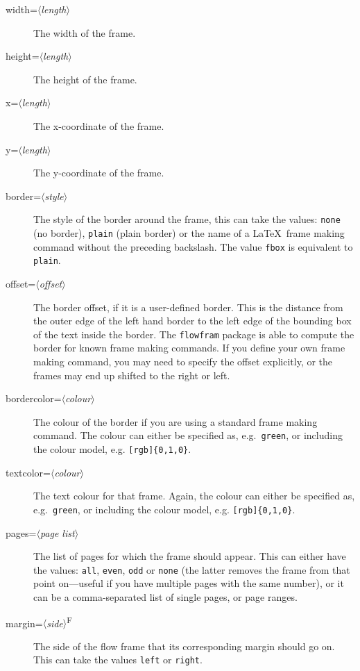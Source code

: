 \documentclass[a4paper,twoside]{report}
\newcommand{\sty}[1]{\texttt{#1}}
\newcommand{\meta}[1]{$\langle$\emph{#1}$\rangle$}
\begin{document}
\begin{description}
\item[width=\meta{length}]  The width of the frame.

\item[height=\meta{length}] The height of the frame.

\item[x=\meta{length}] The x-coordinate of the frame.

\item[y=\meta{length}] The y-coordinate of the frame.

\item[border=\meta{style}] The style of the border around the
frame, this can take the values: \texttt{none} (no border),
\texttt{plain} (plain border) or the name of a \LaTeX\
frame making command without the preceding backslash.
The value \texttt{fbox} is equivalent to \texttt{plain}.

\item[offset=\meta{offset}] The border offset, if it is a
user-defined border.  This is the distance from the outer
edge of the left hand border to the left edge of the
bounding box of the text inside the border.  The \sty{flowfram}
package is able to compute the border for
known frame making commands.
If you define your own frame making command, you may need to
specify the offset explicitly, or the frames
may end up shifted to the right or left.

\item[bordercolor=\meta{colour}] The colour of the border
if you are using a standard frame making command.
The colour can either be specified as, e.g.\ \texttt{green},
or including the colour model, e.g. \verb/[rgb]{0,1,0}/.

\item[textcolor=\meta{colour}] The text colour for that
frame. Again, the colour can either be specified as,
e.g.\ \texttt{green}, or including the colour model,
e.g. \verb/[rgb]{0,1,0}/.

\item[pages=\meta{page list}] The {list of
pages} for which the frame
should appear. This can either have the values: \texttt{all},
\texttt{even}, \texttt{odd} or \texttt{none} (the latter
removes the frame from that point on---useful if you
have multiple pages with the same number), or it can be a
comma-separated list of single pages, or
{page ranges}.

\item[margin=\meta{side}\textsuperscript{F}] The side of
the flow frame that its corresponding margin should go on. This
can take the values \texttt{left} or \texttt{right}.


\end{description}
\end{document}
